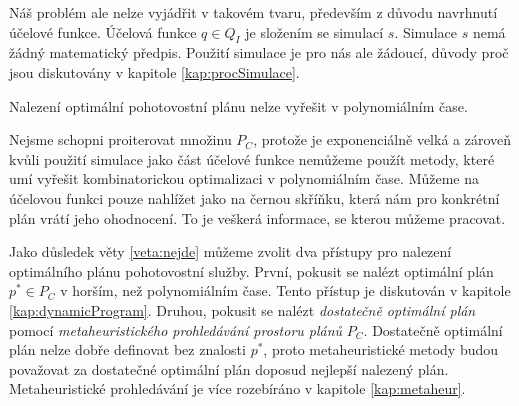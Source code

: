 Náš problém ale nelze vyjádřit v takovém tvaru, především z důvodu navrhnutí účelové funkce.
Účelová funkce $q \in Q_I$ je složením se simulací $s$. Simulace $s$ nemá žádný matematický předpis.
Použití simulace je pro nás ale žádoucí, důvody proč jsou diskutovány v kapitole \ref{kap:procSimulace}.

\begin{veta}\label{veta:nejde}
  Nalezení optimální pohotovostní plánu nelze vyřešit v polynomiálním čase.
\end{veta}
\begin{dukaz}
  Nejsme schopni proiterovat množinu $P_C$, protože je exponenciálně velká a zároveň kvůli použití simulace jako část účelové funkce nemůžeme použít metody,
  které umí vyřešit kombinatorickou optimalizaci v polynomiálním čase.
  Můžeme na účelovou funkci pouze nahlížet jako na černou skříňku, která nám pro konkrétní plán vrátí jeho ohodnocení. 
  To je veškerá informace, se kterou můžeme pracovat.
\end{dukaz}

Jako důsledek věty \ref{veta:nejde} můžeme zvolit dva přístupy pro nalezení optimálního plánu pohotovostní služby. 
První, pokusit se nalézt optimální plán $p^* \in P_C$ v horším, než polynomiálním čase. Tento přístup je diskutován v kapitole \ref{kap:dynamicProgram}.
Druhou, pokusit se nalézt \textit{dostatečně optimální plán} pomocí \textit{metaheuristického prohledávání prostoru plánů} $P_C$.
Dostatečně optimální plán nelze dobře definovat bez znalosti $p^*$, proto metaheuristické metody budou považovat za dostatečné optimální plán doposud nejlepší nalezený plán.
Metaheuristické prohledávání je více rozebíráno v kapitole \ref{kap:metaheur}.

